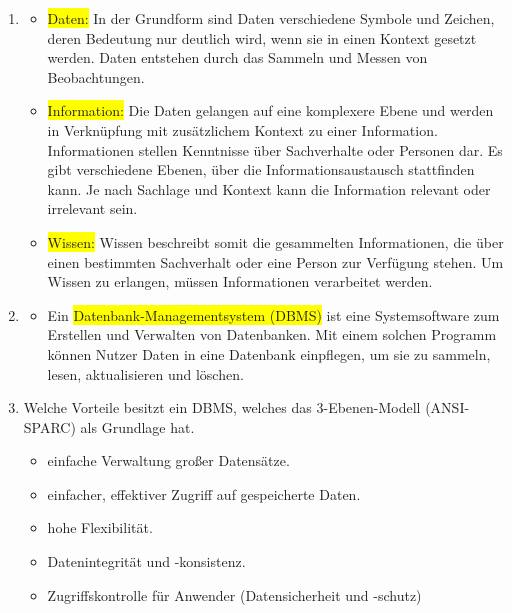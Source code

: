 \begin{enumerate}
    \item \color{brown}{Erläutern Sie den Unterschied zwischen Daten, Information und Wissen.}
    \begin{itemize}\color{black}
        \item \colorbox{yellow}{Daten:} In der Grundform sind Daten verschiedene Symbole und Zeichen, deren Bedeutung nur deutlich wird, wenn sie in einen Kontext gesetzt werden.
        Daten entstehen durch das Sammeln und Messen von Beobachtungen.
        \item \colorbox{yellow}{Information:} Die Daten gelangen auf eine komplexere Ebene und werden in Verknüpfung mit zusätzlichem Kontext zu einer Information.
        Informationen stellen Kenntnisse über Sachverhalte oder Personen dar.
        Es gibt verschiedene Ebenen, über die Informationsaustausch stattfinden kann.
        Je nach Sachlage und Kontext kann die Information relevant oder irrelevant sein.
        \item \colorbox{yellow}{Wissen:} Wissen beschreibt somit die gesammelten Informationen, die über einen bestimmten Sachverhalt oder eine Person zur Verfügung stehen.
        Um Wissen zu erlangen, müssen Informationen verarbeitet werden.
    \end{itemize}
    \item \color{brown}{Was versteht man unter einem Datenbankmanagementsystem DBMS?}
    \begin{itemize}\color{black}
        \item[] Ein \colorbox{yellow}{Datenbank-Managementsystem (DBMS)} ist eine Systemsoftware zum Erstellen und Verwalten von Datenbanken.
        Mit einem solchen Programm können Nutzer Daten in eine Datenbank einpflegen, um sie zu sammeln, lesen, aktualisieren und löschen.
    \end{itemize}
    \item \color{brown} {Welche Vorteile besitzt ein DBMS, welches das 3-Ebenen-Modell (ANSI-SPARC) als Grundlage hat.}
    \begin{itemize}\color{black}
        \item einfache Verwaltung großer Datensätze.
        \item einfacher, effektiver Zugriff auf gespeicherte Daten.
        \item hohe Flexibilität.
        \item Datenintegrität und -konsistenz.
        \item Zugriffskontrolle für Anwender (Datensicherheit und -schutz)

\end{itemize}
\end{enumerate}
